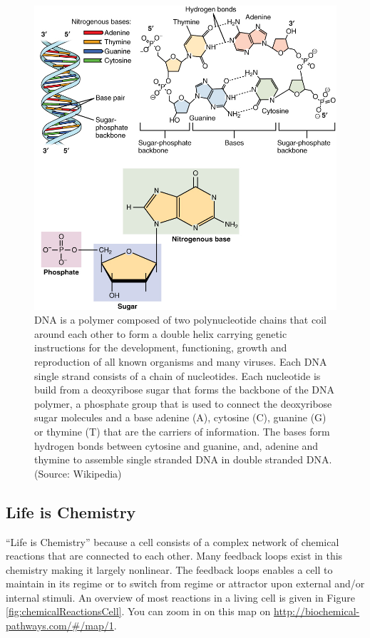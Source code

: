 \documentclass[
  11pt,
]{book}
\begin{document}
\begin{figure}

{\centering \includegraphics[width=0.5\linewidth]{./figs/DNA_Nucleotides} 

}

\caption{DNA is a polymer composed of two polynucleotide chains that coil around each other to form a double helix carrying genetic instructions for the development, functioning, growth and reproduction of all known organisms and many viruses. Each DNA single strand consists of a chain of nucleotides. Each nucleotide is build from a deoxyribose sugar that forms the backbone of the DNA  polymer, a phosphate group that is used to connect the deoxyribose sugar molecules and a base adenine (A), cytosine (C), guanine (G) or thymine (T) that are the carriers of information. The bases form hydrogen bonds between cytosine and guanine, and, adenine and thymine to assemble single stranded DNA in double stranded DNA. (Source: Wikipedia)}\label{fig:DNA}
\end{figure}

\newpage

\hypertarget{life-is-chemistry}{%
\subsection{Life is Chemistry}\label{life-is-chemistry}}

``Life is Chemistry'' because a cell consists of a complex network of chemical reactions that are connected to each other. Many feedback loops exist in this chemistry making it largely nonlinear. The feedback loops enables a cell to maintain in its regime or to switch from regime or attractor upon external and/or internal stimuli. An overview of most reactions in a living cell is given in Figure \ref{fig:chemicalReactionsCell}. You can zoom in on this map on \url{http://biochemical-pathways.com/\#/map/1}.
\end{document}
